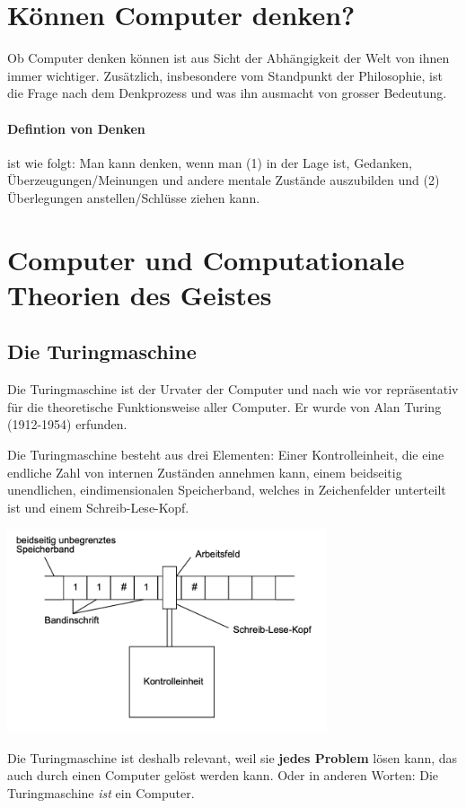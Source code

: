 \documentclass[../main.tex]{subfiles}
\begin{document}
\section{Können Computer denken?}
Ob Computer denken können ist aus Sicht der Abhängigkeit der Welt von ihnen immer wichtiger. Zusätzlich, insbesondere vom Standpunkt der Philosophie, ist die Frage nach dem Denkprozess und was ihn ausmacht von grosser Bedeutung. 

\paragraph{Defintion von Denken} ist wie folgt: Man kann denken, wenn man (1) in der Lage ist, Gedanken, Überzeugungen/Meinungen und andere mentale Zustände auszubilden und (2) Überlegungen anstellen/Schlüsse ziehen kann. 

\section{Computer und Computationale Theorien des Geistes}
\subsection{Die Turingmaschine}
Die Turingmaschine ist der Urvater der Computer und nach wie vor repräsentativ für die theoretische Funktionsweise aller Computer. Er wurde von Alan Turing (1912-1954) erfunden. 

Die Turingmaschine besteht aus drei Elementen: Einer Kontrolleinheit, die eine endliche Zahl von internen Zuständen annehmen kann, einem beidseitig unendlichen, eindimensionalen Speicherband, welches in Zeichenfelder unterteilt ist und einem Schreib-Lese-Kopf. 

{\centering\includegraphics[height=6cm]{images/turing_maschine.png}\endcenter}

Die Turingmaschine ist deshalb relevant, weil sie \textbf{jedes Problem} lösen kann, das auch durch einen Computer gelöst werden kann. Oder in anderen Worten: Die Turingmaschine \textit{ist} ein Computer. 
\end{document}
